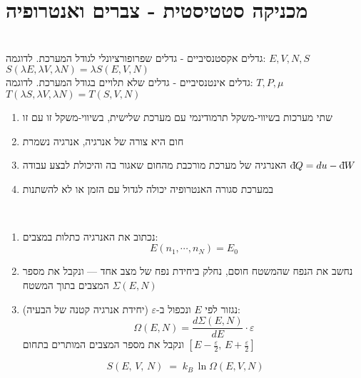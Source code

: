 \section{מכניקה סטטיסטית - צברים ואנטרופיה}
\begin{cheatformula} \\
    גדלים אקסטנסיביים - גדלים שפרופורציונלי לגודל המערכת. לדוגמה:
    $E,V,N,S$ \\
    $S(\lambda E,\lambda V,\lambda N) = \lambda S(E,V,N)$ \\
    גדלים אינטנסיביים - גדלים שלא תלויים בגודל המערכת. לדוגמה:
    $T,P,\mu$ \\
    $T(\lambda S, \lambda V, \lambda N) = T(S, V, N)$
\end{cheatformula}

\begin{cheatformula}
    \begin{enumerate}
        \item שתי מערכות בשיווי-משקל תרמודינמי עם מערכת שלישית, בשיווי-משקל זו עם זו
        \item חום היא צורה של אנרגיה, אנרגיה נשמרת
        \item האנרגיה של מערכת מורכבת מהחום שאגור בה והיכולת לבצע עבודה 
        $\mathrm{d}\hspace*{-0.1405em}\bar{}\hspace*{0.1em} Q = du - \mathrm{d}\hspace*{-0.1405em}\bar{}\hspace*{0.1em} W$
        \item במערכת סגורה האנטרופיה יכולה לגדול עם הזמן או לא להשתנות
    \end{enumerate}
\end{cheatformula}
\begin{cheatformula}\\
\begin{flushright}
\begin{enumerate}
    \item נכתוב את האנרגיה כתלות במצבים: 
    $$E(n_{1},\cdots,n_{N}) = E_{0}$$
    \item נחשב את הנפח שהמשטח חוסם, נחלק ביחידת נפח של מצב אחד — ונקבל את מספר המצבים בתוך המשטח
    $\Sigma(E, N)$
    \item נגזור לפי $E$ ונכפול ב-$\varepsilon$ (יחידת אנרגיה קטנה של הבעיה):
    $$\Omega(E,N) = \frac{d\Sigma(E, N)}{dE} \cdot \varepsilon$$    
    ונקבל את מספר המצבים המותרים בתחום 
    $\left[E - \frac{\varepsilon}{2},\, E + \frac{\varepsilon}{2} \right]$
    
\end{enumerate}
\end{flushright}

\begin{cheatformula}[אנטרופיה]
    $$S(E,\,V,\,N) \;=\; k_{B}\,\ln \Omega(E,V,N)$$
\end{cheatformula}
\end{cheatformula}
